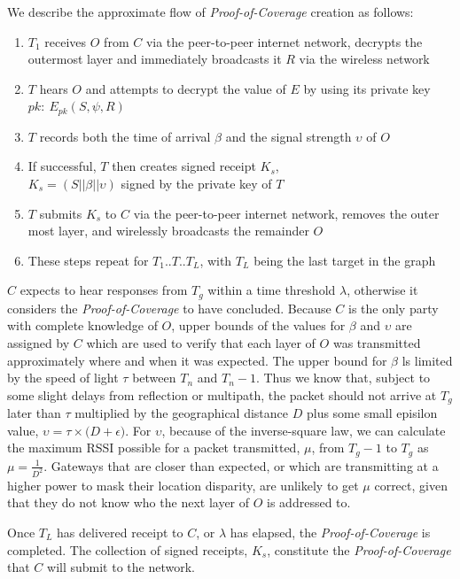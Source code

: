 \documentclass[UTF8, 10pt, nonatbib, nocopyrightspace, reprint]{sigplanconf}
\begin{document}
We describe the approximate flow of \emph{Proof-of-Coverage} creation as follows:

\begin{enumerate}
  \item $T_1$ receives $O$ from $C$ via the peer-to-peer internet network, decrypts the outermost layer and immediately broadcasts it $R$ via the wireless network
  \item $T$ hears $O$ and attempts to decrypt the value of $E$ by using its private key $pk:\ E_{pk}\left(S, \psi, R\right)$
  \item $T$ records both the time of arrival $\beta$ and the signal strength $\upsilon$ of $O$
  \item If successful, $T$ then creates signed receipt $K_s$, \\${K_s = \left(S || \beta || \upsilon\right)}$ signed by the private key of $T$
  \item $T$ submits $K_s$ to $C$ via the peer-to-peer internet network, removes the outer most layer, and wirelessly broadcasts the remainder $O$
  \item These steps repeat for $T_1$..$T$..$T_L$, with $T_L$ being the last target in the graph
\end{enumerate}

$C$ expects to hear responses from $T_g$ within a time threshold $\lambda$, otherwise it considers the \emph{Proof-of-Coverage} to have concluded. Because $C$ is the only party with complete knowledge of $O$, upper bounds of the values for $\beta$ and $\upsilon$ are assigned by $C$ which are used to verify that each layer of $O$ was transmitted approximately where and when it was expected. The upper bound for $\beta$ ls limited by the speed of light $\tau$ between $T_n$ and $T_n-1$. Thus we know that, subject to some slight delays from reflection or multipath, the packet should not arrive at $T_g$ later than $\tau$ multiplied by the geographical distance $D$ plus some small episilon value, $\upsilon = \tau \times \Big(D + \epsilon\Big)$. For $\upsilon$, because of the inverse-square law, we can calculate the maximum RSSI possible for a packet transmitted, $\mu$, from $T_g-1$ to $T_g$ as $\mu = \frac{1}{D^2}$. Gateways that are closer than expected, or which are transmitting at a higher power to mask their location disparity, are unlikely to get $\mu$ correct, given that they do not know who the next layer of $O$ is addressed to.

Once $T_L$ has delivered receipt to $C$, or $\lambda$ has elapsed, the \emph{Proof-of-Coverage} is completed. The collection of signed receipts, $K_s$, constitute the \emph{Proof-of-Coverage} that $C$ will submit to the network.
\end{document}
